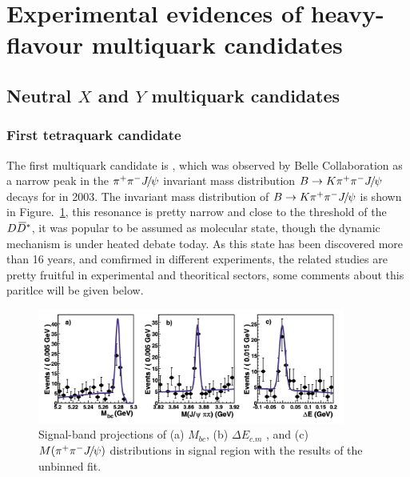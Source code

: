 
\section{Experimental evidences of heavy-flavour multiquark candidates}
\label{subsection:experimental_introduction}


\subsection{Neutral $X$ and $Y$ multiquark candidates}

\subsubsection{First tetraquark candidate \theX}

The first multiquark candidate is \theX, 
which was observed by Belle Collaboration as a narrow peak in the ${{\pi}^+}{{\pi}^-}{{J\mskip -3mu/\mskip -2mu\psi}}$ invariant mass distribution 
$B\rightarrow K{{\pi}^+}{{\pi}^-}{{J\mskip -3mu/\mskip -2mu\psi}}$ decays for in 2003\supercite{PhysRevLett.91.262001}.
The invariant mass distribution of $B\rightarrow K{{\pi}^+}{{\pi}^-}{{J\mskip -3mu/\mskip -2mu\psi}}$ is shown in Figure.~\ref{fig:X3872_BELLE},
this resonance is pretty narrow and close to the threshold of the ${D}{{\kern 0.18em\overline{\kern -0.18em D}}{}^*}$,
it was popular to be assumed as molecular state,
though the dynamic mechanism is under heated debate today. 
As this state has been discovered more than 16 years, 
and comfirmed in different experiments,
the related studies are pretty fruitful in experimental and theoritical sectors,
some comments about this paritlce will be given below.


\begin{figure}[!hbtp]
\centering
\includegraphics[width=0.9\textwidth]{Figures/01_Introduction/Exotic/X3872_BELLE}%
\caption{Signal-band projections of (a) $M_{bc}$, (b) $\Delta E_{c.m}$ , and (c) $M({{\pi}^+}{{\pi}^-}{{J\mskip -3mu/\mskip -2mu\psi}})$ distributions in
   signal region with the results of the unbinned fit\supercite{PhysRevLett.91.262001}.}
\label{fig:X3872_BELLE}
\end{figure}

